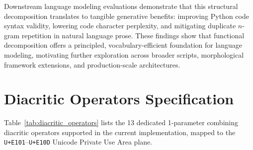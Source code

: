 \documentclass{article}
\begin{document}
Downstream language modeling evaluations demonstrate that this structural decomposition translates to tangible generative benefits: improving Python code syntax validity, lowering code character perplexity, and mitigating duplicate $n$-gram repetition in natural language prose. These findings show that functional decomposition offers a principled, vocabulary-efficient foundation for language modeling, motivating further exploration across broader scripts, morphological framework extensions, and production-scale architectures.
\pagebreak
\appendix

\section{Diacritic Operators Specification}
\label{sec:appendix_diacritics}

Table~\ref{tab:diacritic_operators} lists the 13 dedicated 1-parameter combining diacritic operators supported in the current implementation, mapped to the \texttt{U+E101}--\texttt{U+E10D} Unicode Private Use Area plane.
\end{document}
